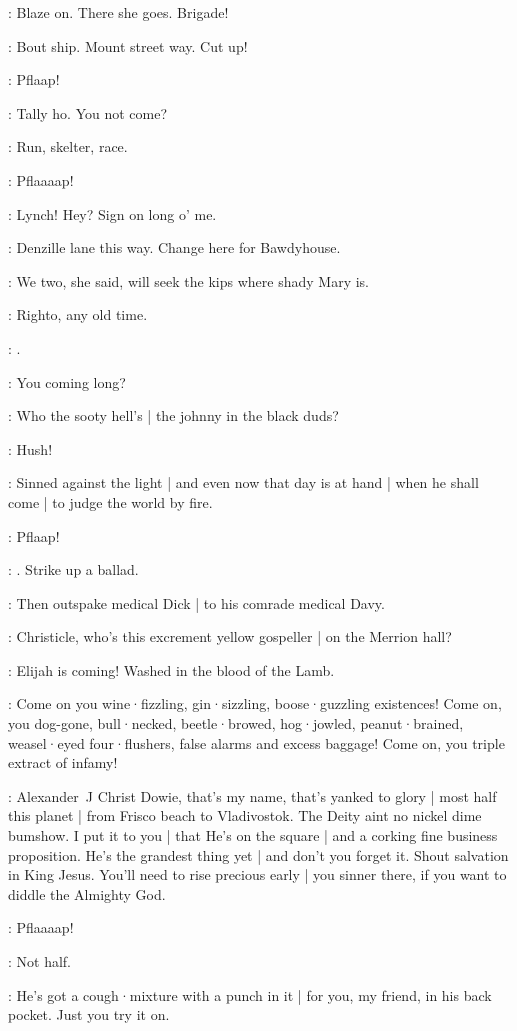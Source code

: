 \lenehan:
Blaze on.
There she goes.
Brigade!

\punch:
Bout ship.
Mount street way.
Cut up!

\bystander:
Pflaap!

\lynch:
Tally ho.
You not come?

\Bloom:
Run,
skelter,
race.

\bystander:
Pflaaaap!


\stephen:
Lynch!
Hey?
Sign on long o' me.

\lynch:
Denzille lane this way.
Change here for Bawdyhouse.

\stephen:
We two,
she said,
will seek the kips where shady Mary is.

\lynch:
Righto,
any old time.

\stephen:
.

\lynch:
You coming long?

\stephen:
Who the sooty hell's |
the johnny in the black duds?

\lynch:
Hush!

\dowie:
Sinned against the light |
and even now that day is at hand |
when he shall come |
to judge the world by fire.

\bystander:
Pflaap!

\stephen:
.
Strike up a ballad.

\lynch:
Then outspake medical Dick |
to his comrade medical Davy.

\dixon:
Christicle,
who's this excrement yellow gospeller |
on the Merrion hall?

\dowie:
Elijah is coming!
Washed in the blood of the Lamb.

\dowie:
Come on you wine·fizzling,
gin·sizzling,
boose·guzzling existences!
Come on,
you dog-gone,
bull·necked,
beetle·browed,
hog·jowled,
peanut·brained,
weasel·eyed four·flushers,
false alarms and excess baggage!
Come on,
you triple extract of infamy!

\dowie:
Alexander~J Christ Dowie,
that's my name,
that's yanked to glory |
most half this planet |
from Frisco beach to Vladivostok.
The Deity aint no nickel dime bumshow.
I put it to you |
that He's on the square |
and a corking fine business proposition.
He's the grandest thing yet |
and don't you forget it.
Shout salvation in King Jesus.
You'll need to rise precious early |
you sinner there,
if you want to diddle the Almighty God.

\bystander:
Pflaaaap!

\stephen:
Not half.

\dowie:
He's got a cough·mixture with a punch in it |
for you,
my friend,
in his back pocket.
Just you try it on.

